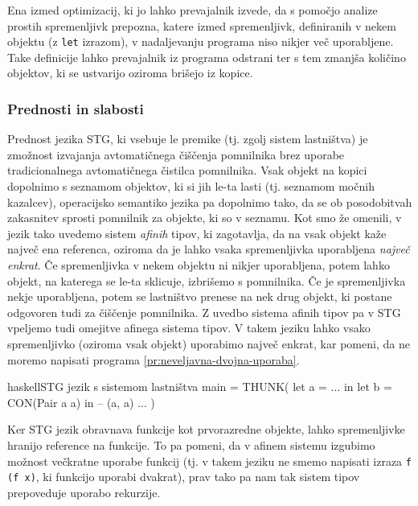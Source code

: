 Ena izmed optimizacij, ki jo lahko prevajalnik izvede, da s pomočjo analize prostih spremenljivk prepozna, katere izmed spremenljivk, definiranih v nekem objektu (z \texttt{let} izrazom), v nadaljevanju programa niso nikjer več uporabljene. Take definicije lahko prevajalnik iz programa odstrani ter s tem zmanjša količino objektov, ki se ustvarijo oziroma brišejo iz kopice.

\subsubsection{Prednosti in slabosti}

Prednost jezika STG, ki vsebuje le premike (tj. zgolj sistem lastništva) je zmožnost izvajanja avtomatičnega čiščenja pomnilnika brez uporabe tradicionalnega avtomatičnega čistilca pomnilnika. Vsak objekt na kopici dopolnimo s seznamom objektov, ki si jih le-ta lasti (tj. seznamom močnih kazalcev), operacijsko semantiko jezika pa dopolnimo tako, da se ob posodobitvah zakasnitev sprosti pomnilnik za objekte, ki so v seznamu. Kot smo že omenili, v jezik tako uvedemo sistem \emph{afinih} tipov, ki zagotavlja, da na vsak objekt kaže največ ena referenca, oziroma da je lahko vsaka spremenljivka uporabljena \emph{največ enkrat}. Če spremenljivka v nekem objektu ni nikjer uporabljena, potem lahko objekt, na katerega se le-ta sklicuje, izbrišemo s pomnilnika. Če je spremenljivka nekje uporabljena, potem se lastništvo prenese na nek drug objekt, ki postane odgovoren tudi za čiščenje pomnilnika. Z uvedbo sistema afinih tipov pa v STG vpeljemo tudi omejitve afinega sistema tipov. V takem jeziku lahko vsako spremenljivko (oziroma vsak objekt) uporabimo največ enkrat, kar pomeni, da ne moremo napisati programa \ref{pr:neveljavna-dvojna-uporaba}.

\begin{primer}[ht]
\centering
\begin{code-box}{haskell}{STG jezik s sistemom lastništva \xmark}
main = THUNK(
    let a = ... in
    let b = CON(Pair a a) in -- (a, a)
        ...
)
\end{code-box}
\caption{Neveljavna dvojna uporaba spremenljivke pri STG jeziku s sistemom lastništva}
\label{pr:neveljavna-dvojna-uporaba}
\end{primer}

Ker STG jezik obravnava funkcije kot prvorazredne objekte, lahko spremenljivke hranijo reference na funkcije. To pa pomeni, da v afinem sistemu izgubimo možnost večkratne uporabe funkcij (tj. v takem jeziku ne smemo napisati izraza \texttt{f (f x)}, ki funkcijo  uporabi dvakrat), prav tako pa nam tak sistem tipov prepoveduje uporabo rekurzije. 


